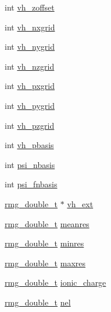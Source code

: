 \begin{DoxyCompactItemize}
\item 
int \hyperlink{struct_c_o_n_t_r_o_l_a626f9831aad464fd8669b82e56b5c52f}{vh\-\_\-zoffset}
\item 
int \hyperlink{struct_c_o_n_t_r_o_l_a886278a472868125c584cc39ade52c15}{vh\-\_\-nxgrid}
\item 
int \hyperlink{struct_c_o_n_t_r_o_l_add980bcd6b018fa6b2649c166af8ca0f}{vh\-\_\-nygrid}
\item 
int \hyperlink{struct_c_o_n_t_r_o_l_aafffa27e9556bb3d09f68a267277f371}{vh\-\_\-nzgrid}
\item 
int \hyperlink{struct_c_o_n_t_r_o_l_afd46e51ccbbf77ad563c099c6060e250}{vh\-\_\-pxgrid}
\item 
int \hyperlink{struct_c_o_n_t_r_o_l_a522c789ed83c543e91cfa1a6a2f60540}{vh\-\_\-pygrid}
\item 
int \hyperlink{struct_c_o_n_t_r_o_l_aa44db649af3c7ee5b6f2d61bd22c0d30}{vh\-\_\-pzgrid}
\item 
int \hyperlink{struct_c_o_n_t_r_o_l_aef0b51bad149aecd6d947741a8e4dfc0}{vh\-\_\-pbasis}
\item 
int \hyperlink{struct_c_o_n_t_r_o_l_a14aa75d8d65eb77394dc1618a41c53eb}{psi\-\_\-nbasis}
\item 
int \hyperlink{struct_c_o_n_t_r_o_l_a8c0a91562cb1bf2e4cb23003e32a8422}{psi\-\_\-fnbasis}
\item 
\hyperlink{rmgtypes_8h_aaa16921c14f121c56eaa42390a340db8}{rmg\-\_\-double\-\_\-t} $\ast$ \hyperlink{struct_c_o_n_t_r_o_l_a5b7c1f58a040c4d04103c8169757b896}{vh\-\_\-ext}
\item 
\hyperlink{rmgtypes_8h_aaa16921c14f121c56eaa42390a340db8}{rmg\-\_\-double\-\_\-t} \hyperlink{struct_c_o_n_t_r_o_l_a94ff63f2c125b1f86fb0ef3a64ee909d}{meanres}
\item 
\hyperlink{rmgtypes_8h_aaa16921c14f121c56eaa42390a340db8}{rmg\-\_\-double\-\_\-t} \hyperlink{struct_c_o_n_t_r_o_l_af44588166a11e3c7ab44121f3613b1bd}{minres}
\item 
\hyperlink{rmgtypes_8h_aaa16921c14f121c56eaa42390a340db8}{rmg\-\_\-double\-\_\-t} \hyperlink{struct_c_o_n_t_r_o_l_a96e343300a07e621d8cc58db0496d773}{maxres}
\item 
\hyperlink{rmgtypes_8h_aaa16921c14f121c56eaa42390a340db8}{rmg\-\_\-double\-\_\-t} \hyperlink{struct_c_o_n_t_r_o_l_aced0aa875f5371fcc8d9de37a85047d4}{ionic\-\_\-charge}
\item 
\hyperlink{rmgtypes_8h_aaa16921c14f121c56eaa42390a340db8}{rmg\-\_\-double\-\_\-t} \hyperlink{struct_c_o_n_t_r_o_l_a74105a83cb5ce462cc6a58f00f5cf3cc}{nel}
\item 

\end{DoxyCompactItemize}
